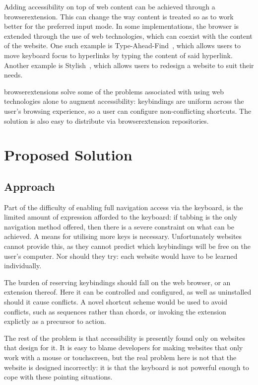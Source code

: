 \documentclass[11pt,openright,a4paper]{report}
\begin{document}
\label{changingwebbrowser}
Adding accessibility on top of web content can be achieved through a \gls{browserextension}. This can change the way content is treated so as to work better for the preferred input mode. In some implementations, the browser is extended through the use of web technologies, which can coexist with the content of the website.
One such example is Type-Ahead-Find~\cite{typeaheadfind}, which allows users to move keyboard focus to hyperlinks by typing the content of said hyperlink. Another example is Stylish~\cite{stylish}, which allows users to redesign a website to suit their needs.

\Glspl{browserextension} solve some of the problems associated with using web technologies alone to augment accessibility: \glspl{keybinding} are uniform across the user's browsing experience, so a user can configure non-conflicting shortcuts. The solution is also easy to distribute via \gls{browserextension} repositories.
\section{Proposed Solution}
\subsection{Approach}
Part of the difficulty of enabling full navigation access via the keyboard, is the limited amount of expression afforded to the keyboard: if tabbing is the only navigation method offered, then there is a severe constraint on what can be achieved. A means for utilising more keys is necessary. Unfortunately websites cannot provide this, as they cannot predict which \glspl{keybinding} will be free on the user's computer. Nor should they try: each website would have to be learned individually.

The burden of reserving \glspl{keybinding} should fall on the web browser, or an extension thereof. Here it can be controlled and configured, as well as uninstalled should it cause conflicts. A novel shortcut scheme would be used to avoid conflicts, such as sequences rather than chords, or invoking the extension explictly as a precursor to action.

The rest of the problem is that accessibility is presently found only on websites that design for it. It is easy to blame developers for making websites that only work with a mouse or touchscreen, but the real problem here is not that the website is designed incorrectly: it is that the keyboard is not powerful enough to cope with these pointing situations.
\end{document}

